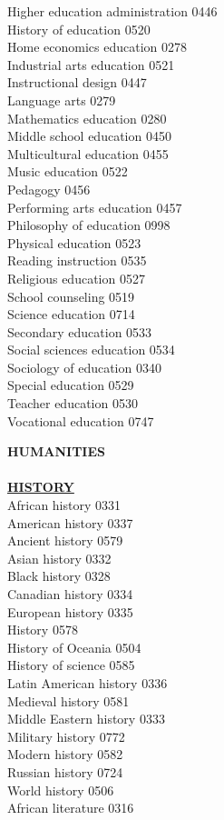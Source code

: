 \documentclass[9pt,twoside]{article}
\newcommand{\categoryheading}[1]{{\fontsize{8}{11}\selectfont \textbf{\uline{#1}}}}
\begin{document}
{\begin{multicols}{3}
Higher education administration \hfill 0446 \\
History of education \hfill 0520 \\
Home economics education \hfill 0278 \\
Industrial arts education \hfill 0521 \\
Instructional design \hfill 0447 \\
Language arts \hfill 0279 \\
Mathematics education \hfill 0280 \\
Middle school education \hfill 0450 \\
Multicultural education \hfill 0455 \\
Music education \hfill 0522 \\
Pedagogy \hfill 0456 \\
Performing arts education \hfill 0457 \\
Philosophy of education \hfill 0998 \\
Physical education \hfill 0523 \\
Reading instruction \hfill 0535 \\
Religious education \hfill 0527 \\
School counseling \hfill 0519 \\
Science education \hfill 0714 \\
Secondary education \hfill 0533 \\
Social sciences education \hfill 0534 \\
Sociology of education \hfill 0340 \\
Special education \hfill 0529 \\
Teacher education \hfill 0530 \\
Vocational education \hfill 0747
\clearpage

\textbf{HUMANITIES} \\
\\
\categoryheading{HISTORY} \\
African history \hfill 0331 \\
American history \hfill 0337 \\
Ancient history \hfill 0579 \\
Asian history \hfill 0332 \\
Black history \hfill 0328 \\
Canadian history \hfill 0334 \\
European history \hfill 0335 \\
History \hfill 0578 \\
History of Oceania \hfill 0504 \\
History of science \hfill 0585 \\
Latin American history \hfill 0336 \\
Medieval history \hfill 0581 \\
Middle Eastern history \hfill 0333 \\
Military history \hfill 0772 \\
Modern history \hfill 0582 \\
Russian history \hfill 0724 \\
World history \hfill 0506 \\
African literature \hfill 0316


\end{multicols}}
\end{document}
